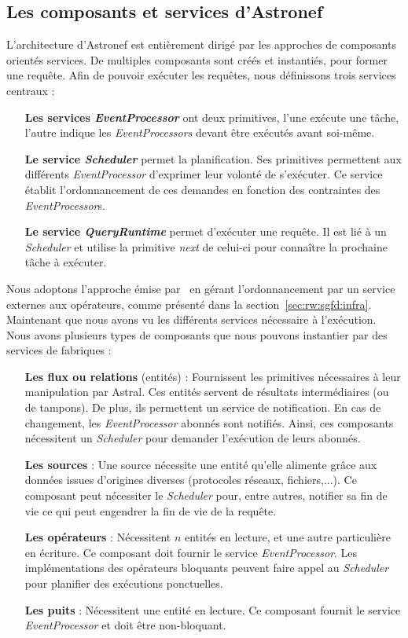 \subsection{Les composants et services d'Astronef}
L'architecture d'Astronef est entièrement dirigé par les approches de composants orientés services. De multiples composants sont créés et instantiés, pour former une requête. Afin de pouvoir exécuter les requêtes, nous définissons trois services centraux :
\begin{itemize}
	\item[\textbf{Les services \textit{EventProcessor}}] ont deux primitives, l'une exécute une tâche, l'autre indique les \textit{EventProcessors} devant être exécutés avant soi-même.
	\item[\textbf{Le service \textit{Scheduler}}] permet la planification. Ses primitives permettent aux différents \textit{EventProcessor} d'exprimer leur volonté de s'exécuter. Ce service établit l'ordonnancement de ces demandes en fonction des contraintes des \textit{EventProcessor}s.
	\item[\textbf{Le service \textit{QueryRuntime}}] permet d'exécuter une requête. Il est lié à un \textit{Scheduler} et utilise la primitive \textit{next} de celui-ci pour connaître la prochaine tâche à exécuter.
\end{itemize}

Nous adoptons l'approche émise par~\cite{Carney:scheduling} en gérant l'ordonnancement par un service externes aux opérateurs, comme présenté dans la section~\ref{sec:rw:sgfd:infra}. Maintenant que nous avons vu les différents services nécessaire à l'exécution. Nous avons plusieurs types de composants que nous pouvons instantier par des services de fabriques :
\begin{itemize}
	\item[\textbf{Les flux ou relations} (entités)] : Fournissent les primitives nécessaires à leur manipulation par Astral. Ces entités servent de résultats intermédiaires (ou de tampons). De plus, ils permettent un service de notification. En cas de changement, les \textit{EventProcessor} abonnés sont notifiés. Ainsi, ces composants nécessitent un \textit{Scheduler} pour demander l'exécution de leurs abonnés.
	\item[\textbf{Les sources}] : Une source nécessite une entité qu'elle alimente grâce aux données issues d'origines diverses (protocoles réseaux, fichiers,...). Ce composant peut nécessiter le \textit{Scheduler} pour, entre autres, notifier sa fin de vie ce qui peut engendrer la fin de vie de la requête.
	\item[\textbf{Les opérateurs}] : Nécessitent $n$ entités en lecture, et une autre particulière en écriture. Ce composant doit fournir le service \textit{EventProcessor}. Les implémentations des opérateurs bloquants peuvent faire appel au \textit{Scheduler} pour planifier des exécutions ponctuelles.
	\item[\textbf{Les puits}] : Nécessitent une entité en lecture. Ce composant fournit le service \textit{EventProcessor} et doit être non-bloquant.
\end{itemize}

